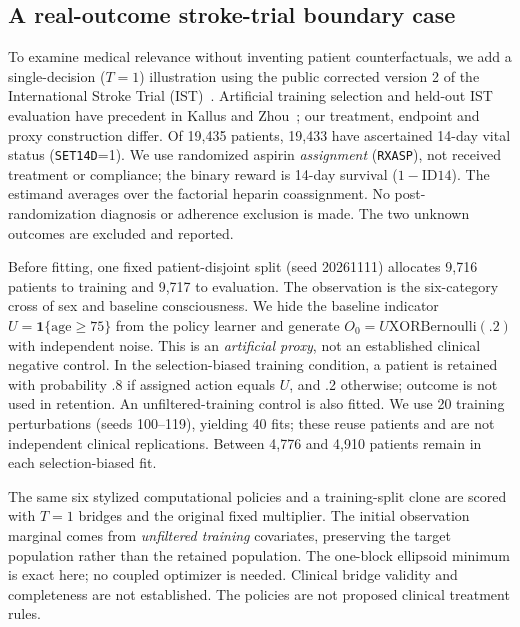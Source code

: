 \documentclass[11pt]{article}
\begin{document}
\subsection{A real-outcome stroke-trial boundary case}
To examine medical relevance without inventing patient counterfactuals, we
add a single-decision ($T=1$) illustration using the public corrected version
2 of the International Stroke Trial (IST)~\cite{istdata,isttrial}.
Artificial training selection and held-out IST evaluation have precedent in
Kallus and Zhou~\cite{kalluszhou}; our treatment, endpoint and proxy construction differ.
Of 19,435 patients, 19,433 have ascertained 14-day vital status
(\texttt{SET14D}=1). We use randomized aspirin \emph{assignment}
(\texttt{RXASP}), not received treatment or compliance; the binary reward is
14-day survival ($1-\mathrm{ID14}$). The estimand averages over the factorial
heparin coassignment. No post-randomization diagnosis or adherence exclusion
is made. The two unknown outcomes are excluded and reported.

Before fitting, one fixed patient-disjoint split (seed 20261111) allocates
9,716 patients to training and 9,717 to evaluation. The observation is the
six-category cross of sex and baseline consciousness. We hide the baseline
indicator $U=\mathbf1\{\mathrm{age}\ge75\}$ from the policy learner and
generate $O_0=U\mathbin{\mathrm{XOR}}\mathrm{Bernoulli}(.2)$ with independent
noise. This is an \emph{artificial proxy}, not an established clinical negative
control. In the selection-biased training condition, a patient is retained
with probability .8 if assigned action equals $U$, and .2 otherwise; outcome
is not used in retention. An unfiltered-training control is also fitted.
We use 20 training perturbations (seeds 100--119), yielding 40 fits; these
reuse patients and are not independent clinical replications. Between 4,776
and 4,910 patients remain in each selection-biased fit.

The same six stylized computational policies and a training-split clone are
scored with $T=1$ bridges and the original fixed multiplier. The initial
observation marginal comes from \emph{unfiltered training} covariates, preserving
the target population rather than the retained population. The one-block
ellipsoid minimum is exact here; no coupled optimizer is needed. Clinical
bridge validity and completeness are not established. The policies are not
proposed clinical treatment rules.
\end{document}
